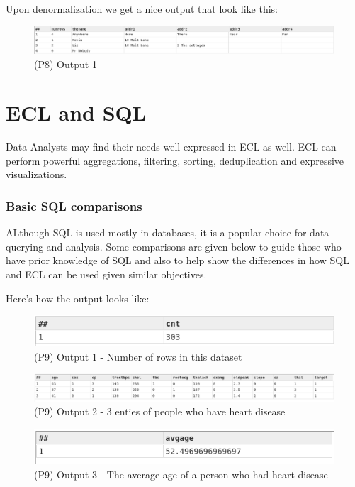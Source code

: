 


Upon denormalization we get a nice output that look like this:

\begin{figure}[h]
    \centering
    \includegraphics[width=1\linewidth]{../output/30/1.png}
    \caption{(P8) Output 1}
\end{figure}



\section{ECL and SQL}

Data Analysts may find their needs well expressed in ECL as well. ECL can perform powerful aggregations, filtering, sorting, deduplication and expressive visualizations.

\subsubsection{Basic SQL comparisons}

ALthough SQL is used mostly in databases, it is a popular choice for data querying and analysis. 
Some comparisons are given below to guide those who have prior knowledge of SQL and also to help show the differences in how SQL and ECL can be used given similar objectives.




Here's how the output looks like:

\begin{figure}[h]
    \centering
    \includegraphics[width=.55\linewidth]{../output/62/1.png}
    \caption{(P9) Output 1 - Number of rows in this dataset}
\end{figure}

\begin{figure}[h]
    \centering
    \includegraphics[width=\linewidth]{../output/62/2}
    \caption{(P9) Output 2 - 3 enties of people who have heart disease}
\end{figure}
\begin{figure}[h]
    \centering
    \includegraphics[width=.55\linewidth]{../output/62/3}
    \caption{(P9) Output 3 - The average age of a person who had heart disease}
\end{figure}

